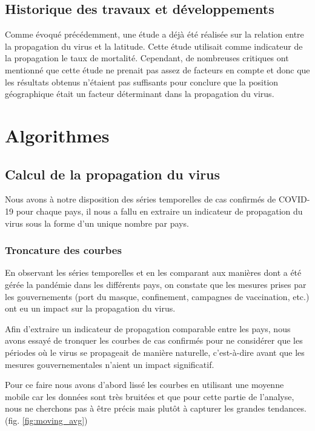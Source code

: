 \documentclass[12pt]{iEEEtran}
\begin{document}
\subsection{Historique des travaux et développements}
Comme évoqué précédemment, une étude \cite{kaggle} a déjà été réalisée sur la relation entre
la propagation du virus et la latitude. Cette étude utilisait comme indicateur de la propagation
le taux de mortalité. Cependant, de nombreuses critiques ont mentionné que cette étude ne prenait
pas assez de facteurs en compte et donc que les résultats obtenus n'étaient pas suffisants pour
conclure que la position géographique était un facteur déterminant dans la propagation du virus.

\section{Algorithmes}
\subsection{Calcul de la propagation du virus}

Nous avons à notre disposition des séries temporelles de cas confirmés de COVID-19 pour chaque
pays, il nous a fallu en extraire un indicateur de propagation du virus sous la forme d'un
unique nombre par pays.

\subsubsection{Troncature des courbes}
En observant les séries temporelles et en les comparant aux manières dont a été gérée la pandémie
dans les différents pays, on constate que les mesures prises par les gouvernements (port du masque,
confinement, campagnes de vaccination, etc.) ont eu un impact sur la propagation du virus.

Afin d'extraire un indicateur de propagation comparable entre les pays, nous avons essayé de tronquer
les courbes de cas confirmés pour ne considérer que les périodes où le virus se propageait de manière
naturelle, c'est-à-dire avant que les mesures gouvernementales n'aient un impact significatif.

Pour ce faire nous avons d'abord lissé les courbes en utilisant une moyenne mobile car les données sont
très bruitées et que pour cette partie de l'analyse, nous ne cherchons pas à être précis mais plutôt à
capturer les grandes tendances. (fig. \ref{fig:moving_avg})
\end{document}
